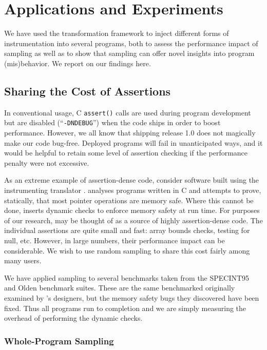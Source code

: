 \section{Applications and Experiments}
\label{sec:applications}

We have used the transformation framework to inject different forms of
instrumentation into several programs, both to assess the performance
impact of sampling as well as to show that sampling can offer novel
insights into program (mis)behavior.  We report on our findings here.

\subsection{Sharing the Cost of Assertions}
\label{sec:share}

In conventional usage, C \texttt{assert()} calls are used during
program development but are disabled (``\texttt{-DNDEBUG}'') when the
code ships in order to boost performance.  However, we all know that
shipping release 1.0 does not magically make our code bug-free.
Deployed programs will fail in unanticipated ways, and it would be
helpful to retain some level of assertion checking if the performance
penalty were not excessive.

As an extreme example of assertion-dense code, consider software built
using the \CCured instrumenting translator \cite{POPL_'02*128}.
\CCured analyses programs written in C and attempts to prove,
statically, that most pointer operations are memory safe.  Where this
cannot be done, \CCured inserts dynamic checks to enforce memory
safety at run time.  For purposes of our research, \CCured may be
thought of as a source of highly assertion-dense code.  The individual
assertions are quite small and fast: array bounds checks, testing for
null, etc.  However, in large numbers, their performance impact can be
considerable.  We wish to use random sampling to share this cost
fairly among many users.

We have applied sampling to several benchmarks taken from the
SPECINT95 \cite{SPEC95} and Olden \cite{Carlisle:1996:OPPWDDSDMM}
benchmark suites.  These are the same benchmarked originally examined
by \CCured's designers, but the memory safety bugs they discovered
have been fixed.  Thus all programs run to completion and we are
simply measuring the overhead of performing the dynamic checks.

\subsubsection{Whole-Program Sampling}
\label{sec:share:whole}


